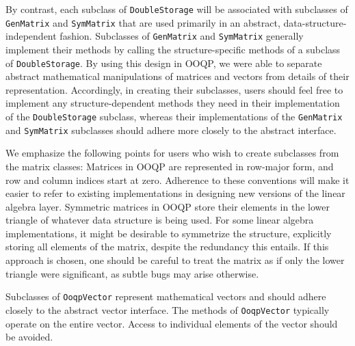 By contrast, each subclass of \texttt{DoubleStorage} will be
associated with subclasses of \texttt{GenMatrix} and
\texttt{SymMatrix} that are used primarily in an abstract,
data-structure-independent fashion. Subclasses of \texttt{GenMatrix}
and \texttt{SymMatrix} generally implement their methods by calling
the structure-specific methods of a subclass of
\texttt{DoubleStorage}. By using this design in OOQP, we were able to
separate abstract mathematical manipulations of matrices and vectors
from details of their representation. Accordingly, in creating their
subclasses, users should feel free to implement any
structure-dependent methods they need in their implementation of the
\texttt{DoubleStorage} subclass, whereas their implementations of the
\texttt{GenMatrix} and \texttt{SymMatrix} subclasses should adhere
more closely to the abstract interface.

We emphasize the following points for users who wish to create
subclasses from the matrix classes: Matrices in OOQP are represented
in row-major form, and row and column indices start at zero. Adherence
to these conventions will make it easier to refer to existing
implementations in designing new versions of the linear algebra layer.
Symmetric matrices in OOQP store their elements in the lower triangle
of whatever data structure is being used. For some linear algebra
implementations, it might be desirable to symmetrize the structure,
explicitly storing all elements of the matrix, despite the redundancy
this entails. If this approach is chosen, one should be careful to
treat the matrix as if only the lower triangle were significant, as
subtle bugs may arise otherwise.

Subclasses of \texttt{OoqpVector} represent mathematical vectors and
should adhere closely to the abstract vector interface. The methods of
\texttt{OoqpVector} typically operate on the entire vector. Access
to individual elements of the vector should be avoided.

